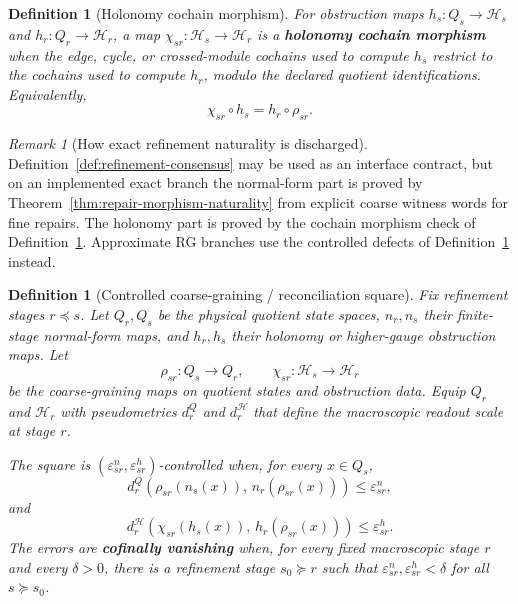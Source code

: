 \documentclass[11pt]{article}
\newtheorem{definition}[theorem]{Definition}
\theoremstyle{remark}
\newtheorem{remark}[theorem]{Remark}
\theoremstyle{plain}
\begin{document}
\begin{definition}[Holonomy cochain morphism]\label{def:holonomy-cochain-morphism}
For obstruction maps \(h_s:Q_s\to\mathcal H_s\) and \(h_r:Q_r\to\mathcal H_r\), a map
\(\chi_{sr}:\mathcal H_s\to\mathcal H_r\) is a \textbf{holonomy cochain morphism} when the
edge, cycle, or crossed-module cochains used to compute \(h_s\) restrict to the cochains used to
compute \(h_r\), modulo the declared quotient identifications. Equivalently,
\[
\chi_{sr}\circ h_s=h_r\circ\rho_{sr}.
\]
\end{definition}

\begin{remark}[How exact refinement naturality is discharged]\label{rem:exact-naturality-discharge}
Definition~\ref{def:refinement-consensus} may be used as an interface contract, but on an
implemented exact branch the normal-form part is proved by Theorem~\ref{thm:repair-morphism-naturality}
from explicit coarse witness words for fine repairs. The holonomy part is proved by the cochain
morphism check of Definition~\ref{def:holonomy-cochain-morphism}. Approximate RG branches use the
controlled defects of Definition~\ref{def:controlled-coarse-consensus} instead.
\end{remark}

\begin{definition}[Controlled coarse-graining / reconciliation square]\label{def:controlled-coarse-consensus}
Fix refinement stages \(r\preceq s\). Let \(Q_r,Q_s\) be the physical quotient state spaces,
\(n_r,n_s\) their finite-stage normal-form maps, and \(h_r,h_s\) their holonomy or
higher-gauge obstruction maps. Let
\[
\rho_{sr}:Q_s\to Q_r,
\qquad
\chi_{sr}:\mathcal H_s\to\mathcal H_r
\]
be the coarse-graining maps on quotient states and obstruction data. Equip \(Q_r\) and
\(\mathcal H_r\) with pseudometrics \(d^Q_r\) and \(d^{\mathcal H}_r\) that define the
macroscopic readout scale at stage \(r\).

The square is \((\varepsilon^n_{sr},\varepsilon^h_{sr})\)-controlled when, for every
\(x\in Q_s\),
\[
d^Q_r\!\left(\rho_{sr}(n_s(x)),\,n_r(\rho_{sr}(x))\right)
\le \varepsilon^n_{sr},
\]
and
\[
d^{\mathcal H}_r\!\left(\chi_{sr}(h_s(x)),\,h_r(\rho_{sr}(x))\right)
\le \varepsilon^h_{sr}.
\]
The errors are \textbf{cofinally vanishing} when, for every fixed macroscopic stage \(r\) and
every \(\delta>0\), there is a refinement stage \(s_0\succeq r\) such that
\(\varepsilon^n_{sr},\varepsilon^h_{sr}<\delta\) for all \(s\succeq s_0\).
\end{definition}
\end{document}
